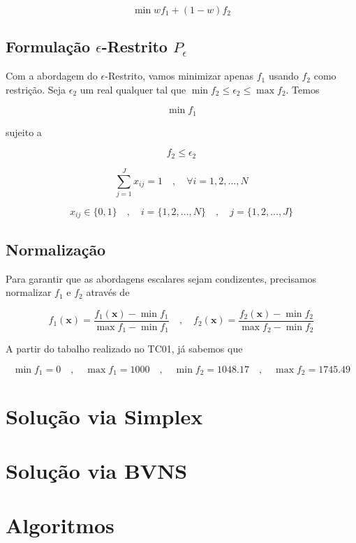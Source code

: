 \documentclass[
	12pt,				%
	oneside,			%
	a4paper,			%
	chapter=TITLE,
	sumario=tradicional,
	english,			%
	brazil				%
]{abntex2}
\begin{document}
\[  \min wf_1 + (1-w)f_2  \]



\section{Formulação $\epsilon$-Restrito $P_{\epsilon}$}

Com a abordagem do $\epsilon$-Restrito, vamos minimizar apenas $f_1$ 
usando $f_2$ como restrição. Seja $\epsilon_2$ um real qualquer tal que  $\min f_2 \leq \epsilon_2 \leq \max f_2$.
Temos 

\begin{equation}\label{eq:objf2}
	\min f_1
\end{equation}

\noindent sujeito a 

\[ f_2 \leq \epsilon_2 \]

\[ \sum_{j=1}^{J} x_{ij} = 1 \quad , \quad \forall i = {1, 2, ..., N} \]

\[ x_{ij} \in \{0,1\} \quad , \quad i = \{1, 2, ..., N\}  \quad , \quad j = \{1, 2, ..., J\} \]

\section{Normalização}

Para garantir que as abordagens escalares sejam condizentes, precisamos normalizar $f_1$ e $f_2$ 
através de 

\[ 
f_1(\mathbf{x}) = \frac{f_1(\mathbf{x}) - \min f_1}{\max f_1 - \min f_1}
\quad , \quad 
f_2(\mathbf{x}) = \frac{f_2(\mathbf{x}) - \min f_2}{\max f_2 - \min f_2} 
\]

A partir do tabalho realizado no TC01, já sabemos que 

\[ 
\min f_1 = 0 \quad , \quad 
\max f_1 = 1000 \quad , \quad 
\min f_2 = 1048.17 \quad , \quad 
\max f_2 = 1745.49 
\]

\chapter{Solução via Simplex}\label{cap:simplex} 

\chapter{Solução via BVNS}\label{cap:bnvs} 


\chapter{Algoritmos}\label{cap:algoritmos} 
\end{document}
